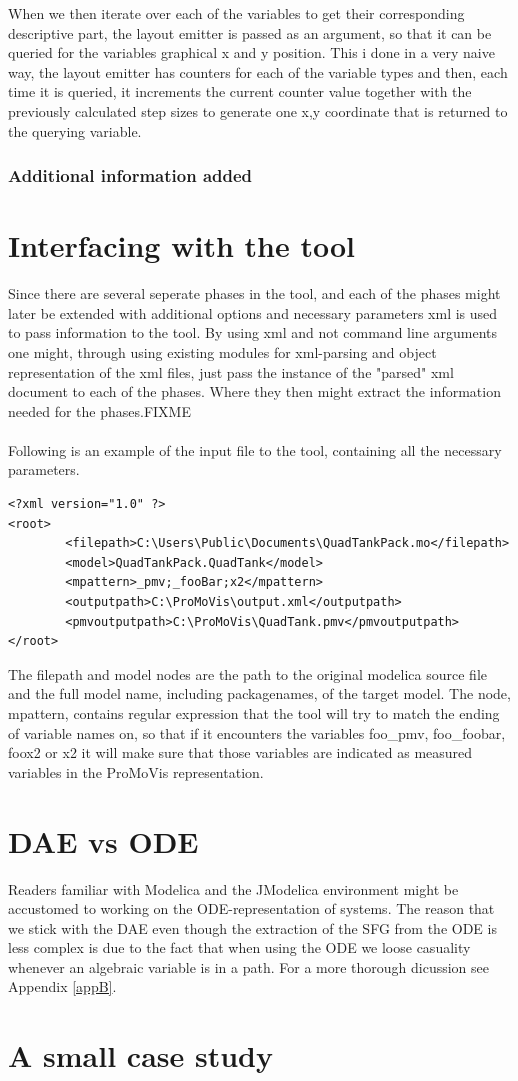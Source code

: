 When we then iterate over each of the variables to get their corresponding descriptive part, the layout emitter is passed as an argument, so that it can be queried for the variables graphical x and y position. This i done in a very naive way, the layout emitter has counters for each of the variable types and then, each time it is queried, it increments the current counter value together with the previously calculated step sizes to generate one x,y coordinate that is returned to the querying variable. 
\subsubsection{Additional information added}

\section{Interfacing with the tool}
Since there are several seperate phases in the tool, and each of the phases might later be extended with additional options and necessary parameters xml is used to pass information to the tool. By using xml and not command line arguments one might, through using existing modules for xml-parsing and object representation of the xml files, just pass the instance of the "parsed" xml document to each of the phases. Where they then might extract the information needed for the phases.FIXME\\\\Following is an example of the input file to the tool, containing all the necessary parameters.
\begin{lstlisting}
<?xml version="1.0" ?> 
<root>
        <filepath>C:\Users\Public\Documents\QuadTankPack.mo</filepath>
        <model>QuadTankPack.QuadTank</model>
        <mpattern>_pmv;_fooBar;x2</mpattern>
        <outputpath>C:\ProMoVis\output.xml</outputpath>
        <pmvoutputpath>C:\ProMoVis\QuadTank.pmv</pmvoutputpath>
</root>
\end{lstlisting}
The filepath and model nodes are the path to the original modelica source file and the full model name, including packagenames, of the target model. The node, mpattern, contains regular expression that the tool will try to match the ending of variable names on, so that if it encounters the variables foo\_pmv, foo\_foobar, foox2 or x2 it will make sure that those variables are indicated as measured variables in the ProMoVis representation.


\section{DAE vs ODE}
Readers familiar with Modelica and the JModelica environment might be accustomed to working on the ODE-representation of systems. The reason that we stick with the DAE even though the extraction of the SFG from the ODE is less complex is due to the fact that when using the ODE we loose casuality whenever an algebraic variable is in a path. For a more thorough dicussion see Appendix \ref{appB}.


\section{A small case study}